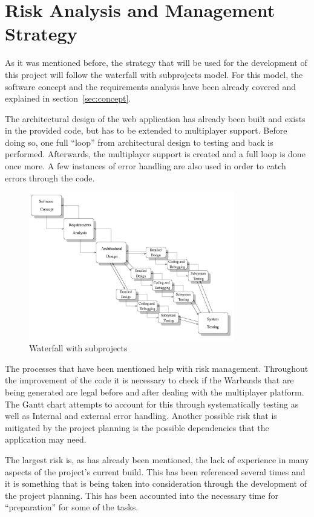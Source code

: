 \documentclass[12pt,a4paper]{article}
\begin{document}
\section{Risk Analysis and Management Strategy}

As it was mentioned before, the strategy that will be used for the development of this project will follow the waterfall with subprojects model. For this model, the software concept and the requirements analysis have been already covered and explained in section~\ref{sec:concept}. 

The architectural design of the web application has already been built and exists in the provided code, but has to be extended to multiplayer support. Before doing so, one full ``loop'' from architectural design to testing and back is performed. Afterwards, the multiplayer support is created and a full loop is done once more. A few instances of error handling are also used in order to catch errors through the code. 

\begin{figure}[ht]
 \centering
 \includegraphics[width=0.8\textwidth]{img/waterfall_subp}
 \caption{Waterfall with subprojects}
\end{figure}

The processes that have been mentioned help with risk management. Throughout the improvement of the code it is necessary to check if the Warbands that are being generated are legal before and after dealing with the multiplayer platform. The Gantt chart attempts to account for this through systematically testing as well as Internal and external error handling. Another possible risk that is mitigated by the project planning is the possible dependencies that the application may need. 

The largest risk is, as has already been mentioned, the lack of experience in many aspects of the project's current build. This has been referenced several times and it is something that is being taken into consideration through the development of the project planning. This has been accounted into the necessary time for ``preparation'' for some of the tasks. 
\end{document}
